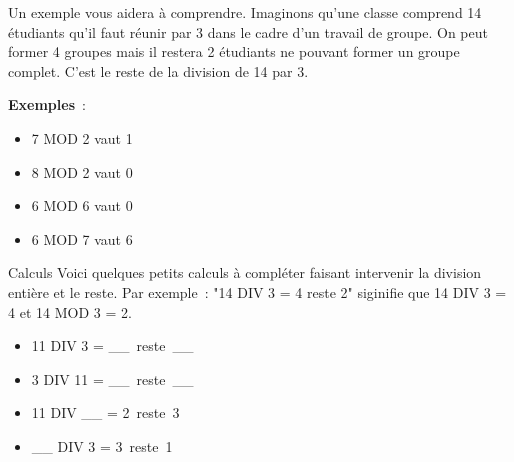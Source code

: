 			Un exemple vous aidera à comprendre.	
			Imaginons qu’une classe comprend 14 étudiants
			qu’il faut réunir par 3
			dans le cadre d’un travail de groupe.
			On peut former 4 groupes 
			mais il restera 2 étudiants ne pouvant former un groupe complet.
			C’est le reste de la division de 14 par 3.
			
			\begin{minipage}{2cm}
			\textbf{Exemples}~:	
			\\
			\end{minipage}
			\begin{minipage}{9cm}
			\begin{multicols}{2}
			\begin{itemize}
				\item 7 MOD 2 vaut 1
				\item 8 MOD 2 vaut 0
				\item 6 MOD 6 vaut 0
				\item 6 MOD 7 vaut 6
			\end{itemize}
			\end{multicols}
			\end{minipage}

			\begin{Exercice}{Calculs}
				Voici quelques petits calculs à compléter
				faisant intervenir la division entière et le reste.
				Par exemple~: "14 DIV 3 = 4 reste 2"
				siginifie que 14 DIV 3 = 4 et 14 MOD 3 = 2.
				
				\begin{multicols}{2}
					\begin{itemize}
					\item 11 DIV 3 = \_\_\ reste\ \_\_
					\item 3 DIV 11 = \_\_\ reste\ \_\_
					\item 11 DIV \_\_ = 2\ reste\ 3
					\item \_\_ DIV 3 = 3\ reste\ 1
					\end{itemize}
				\end{multicols}
			\end{Exercice}

